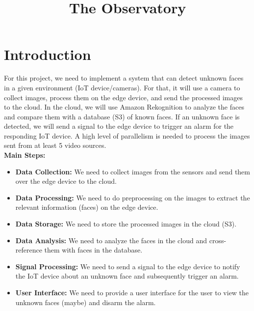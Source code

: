 \documentclass[conference]{IEEEtran}
\begin{document}
\title{The Observatory}

\author{
\and
{}
\and
{}
}

\maketitle

\section{Introduction}
For this project, we need to implement a system that can detect unknown faces in a given environment (IoT device/cameras). 
For that, it will use a camera to collect images, process them on the edge device, and send the processed images to the cloud. 
In the cloud, we will use Amazon Rekognition to analyze the faces and compare them with a database (S3) of known faces. 
If an unknown face is detected, we will send a signal to the edge device to trigger an alarm for the responding IoT device.
A high level of parallelism is needed to process the images sent from at least 5 video sources. 
\\
\textbf{Main Steps:}
\begin{itemize}
    \item \textbf{Data Collection:} We need to collect images from the sensors and send them over the edge device to the cloud.
    \item \textbf{Data Processing:} We need to do preprocessing on the images to extract the relevant information (faces) on the edge device.
    \item \textbf{Data Storage:} We need to store the processed images in the cloud (S3).
    \item \textbf{Data Analysis:} We need to analyze the faces in the cloud and cross-reference them with faces in the database.
    \item \textbf{Signal Processing:} We need to send a signal to the edge device to notify the IoT device about an unknown face and subsequently trigger an alarm.
    \item \textbf{User Interface:} We need to provide a user interface for the user to view the unknown faces (maybe) and disarm the alarm.
\end{itemize}
\end{document}
